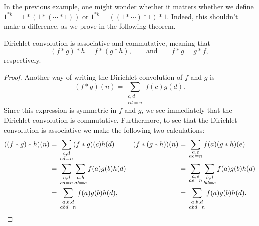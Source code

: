 In the previous example, one might wonder whether it matters whether we define $1^{\ast k}=1\ast(1\ast(\cdots \ast 1))$ or $1^{\ast k}=((1\ast\cdots)\ast 1)\ast 1$. Indeed, this shouldn't make a difference, as we prove in the following theorem.

\begin{theorem}
  Dirichlet convolution is associative and commutative, meaning that
  \begin{equation*}
    (f\ast g)\ast h=f\ast(g\ast h),\qquad\text{and}\qquad f\ast g=g\ast f,
  \end{equation*}
  respectively.
\end{theorem}

\begin{proof}
  Another way of writing the Dirichlet convolution of $f$ and $g$ is
  \begin{equation*}
    (f\ast g)(n) = \sum_{\substack{c,d\\ cd=n}}f(c)g(d).
  \end{equation*}
  Since this expression is symmetric in $f$ and $g$, we see immediately that the Dirichlet convolution is commutative.
  Furthermore, to see that the Dirichlet convolution is associative we make the following two calculations:
  \begin{align*}
    ((f\ast g)\ast h)(n) & = \vphantom{\sum_{\substack{a,b,d\\ abd=n}}}\sum_{\substack{c,d\\ cd=n}}(f\ast g)(c)h(d) & (f\ast (g\ast h))(n) & = \vphantom{\sum_{\substack{a,b,d\\ abd=n}}}\sum_{\substack{a,e\\ae=n}}f(a)(g\ast h)(e) \\
                         & = \vphantom{\sum_{\substack{a,b,d\\ abd=n}}}\sum_{\substack{c,d\\ cd=n}}\sum_{\substack{a,b\\ ab=c}}f(a)g(b)h(d) & & = \vphantom{\sum_{\substack{a,b,d\\ abd=n}}}\sum_{\substack{a,e\\ ae=n}}\sum_{\substack{b,d\\bd=e}}f(a)g(b)h(d) \\
                         & = \vphantom{\sum_{\substack{a,b,d\\ abd=n}}}\sum_{\substack{a,b,d\\ abd=n}}f(a)g(b)h(d), & & = \vphantom{\sum_{\substack{a,b,d\\ abd=n}}}\sum_{\substack{a,b,d\\ abd=n}}f(a)g(b)h(d).\qedhere
  \end{align*}
\end{proof}

